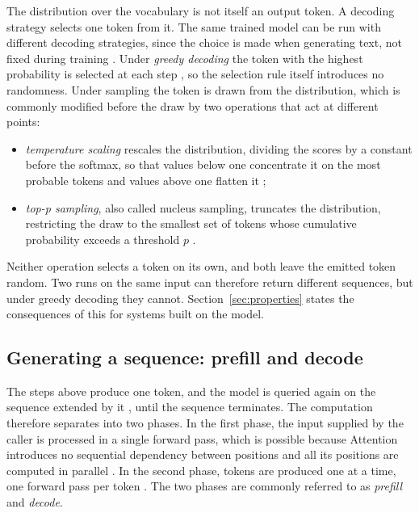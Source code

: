 The distribution over the vocabulary is not itself an output token. A decoding strategy selects one token from it. The same trained model can be run with different decoding strategies, since the choice is made when generating text, not fixed during training \cite{zhaoSurveyLargeLanguage2026}. Under \emph{greedy decoding} the token with the highest probability is selected at each step \cite{zhaoSurveyLargeLanguage2026}, so the selection rule itself introduces no randomness. Under sampling the token is drawn from the distribution, which is commonly modified before the draw by two operations that act at different points:
\begin{itemize}
    \item \emph{temperature scaling} rescales the distribution, dividing the scores by a constant before the softmax, so that values below one concentrate it on the most probable tokens and values above one flatten it \cite{zhaoSurveyLargeLanguage2026};
    \item \emph{top-p sampling}, also called nucleus sampling, truncates the distribution, restricting the draw to the smallest set of tokens whose cumulative probability exceeds a threshold $p$ \cite{zhaoSurveyLargeLanguage2026}.
\end{itemize}
Neither operation selects a token on its own, and both leave the emitted token random. Two runs on the same input can therefore return different sequences, but under greedy decoding they cannot. Section~\ref{sec:properties} states the consequences of this for systems built on the model.

\subsection{Generating a sequence: prefill and decode}
\label{subsec:prefill-decode}

The steps above produce one token, and the model is queried again on the sequence extended by it \cite{zhaoSurveyLargeLanguage2026}, until the sequence terminates. The computation therefore separates into two phases. In the first phase, the input supplied by the caller is processed in a single forward pass, which is possible because Attention introduces no sequential dependency between positions and all its positions are computed in parallel \cite{vaswaniAttentionAllYou2023}. In the second phase, tokens are produced one at a time, one forward pass per token \cite{zhaoSurveyLargeLanguage2026}. The two phases are commonly referred to as \emph{prefill} and \emph{decode}.

